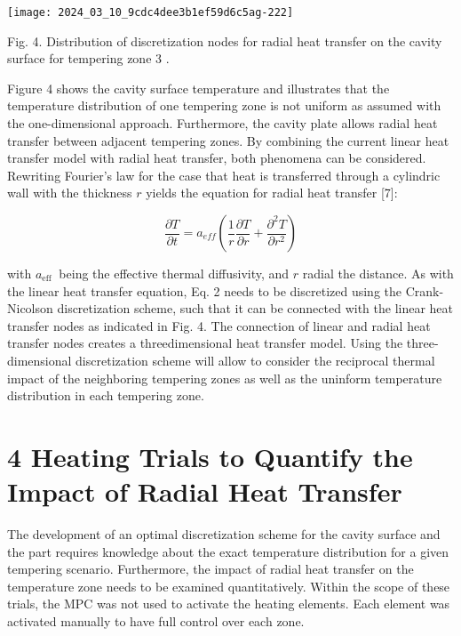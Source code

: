 \documentclass[10pt]{article}
\begin{document}
\begin{center}
\texttt{[image: 2024\_03\_10\_9cdc4dee3b1ef59d6c5ag-222]}
\end{center}

Fig. 4. Distribution of discretization nodes for radial heat transfer on the cavity surface for tempering zone 3 .

Figure 4 shows the cavity surface temperature and illustrates that the temperature distribution of one tempering zone is not uniform as assumed with the one-dimensional approach. Furthermore, the cavity plate allows radial heat transfer between adjacent tempering zones. By combining the current linear heat transfer model with radial heat transfer, both phenomena can be considered. Rewriting Fourier's law for the case that heat is transferred through a cylindric wall with the thickness $r$ yields the equation for radial heat transfer [7]:


\begin{equation*}
\frac{\partial T}{\partial t}=a_{e f f}\left(\frac{1}{r} \frac{\partial T}{\partial r}+\frac{\partial^{2} T}{\partial r^{2}}\right) \tag{2}
\end{equation*}


with $a_{\text {eff }}$ being the effective thermal diffusivity, and $r$ radial the distance. As with the linear heat transfer equation, Eq. 2 needs to be discretized using the Crank-Nicolson discretization scheme, such that it can be connected with the linear heat transfer nodes as indicated in Fig. 4. The connection of linear and radial heat transfer nodes creates a threedimensional heat transfer model. Using the three-dimensional discretization scheme will allow to consider the reciprocal thermal impact of the neighboring tempering zones as well as the uninform temperature distribution in each tempering zone.

\section*{4 Heating Trials to Quantify the Impact of Radial Heat Transfer}
The development of an optimal discretization scheme for the cavity surface and the part requires knowledge about the exact temperature distribution for a given tempering scenario. Furthermore, the impact of radial heat transfer on the temperature zone needs to be examined quantitatively. Within the scope of these trials, the MPC was not used to activate the heating elements. Each element was activated manually to have full control over each zone.
\end{document}
